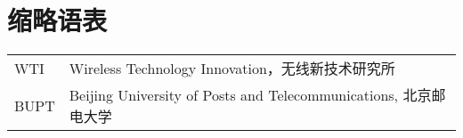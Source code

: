 \chapter{缩略语表}

\begin{longtable}{lp{130mm}}
WTI & Wireless Technology Innovation，无线新技术研究所\\
BUPT & Beijing University of Posts and Telecommunications, 北京邮电大学
\end{longtable}